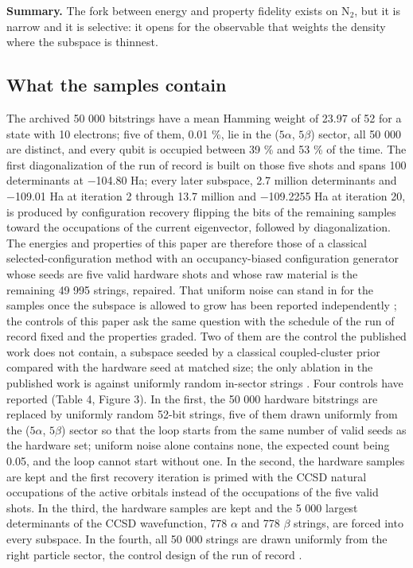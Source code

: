\documentclass[11pt]{article}
\begin{document}
\textbf{Summary.} The fork between energy and property fidelity exists on N$_2$, but it is narrow and it is selective: it opens for the observable that weights the density where the subspace is thinnest.

\subsection{What the samples contain}\label{sec:3.4}


The archived 50 000 bitstrings have a mean Hamming weight of 23.97 of 52 for a state with 10 electrons; five of them, 0.01 \%, lie in the ($5\alpha$, $5\beta$) sector, all 50 000 are distinct, and every qubit is occupied between 39 \% and 53 \% of the time. The first diagonalization of the run of record is built on those five shots and spans 100 determinants at $-$104.80 Ha; every later subspace, 2.7 million determinants and $-$109.01 Ha at iteration 2 through 13.7 million and $-$109.2255 Ha at iteration 20, is produced by configuration recovery flipping the bits of the remaining samples toward the occupations of the current eigenvector, followed by diagonalization. The energies and properties of this paper are therefore those of a classical selected-configuration method with an occupancy-biased configuration generator whose seeds are five valid hardware shots and whose raw material is the remaining 49 995 strings, repaired. That uniform noise can stand in for the samples once the subspace is allowed to grow has been reported independently \cite{vanRossum2026}; the controls of this paper ask the same question with the schedule of the run of record fixed and the properties graded. Two of them are the control the published work does not contain, a subspace seeded by a classical coupled-cluster prior compared with the hardware seed at matched size; the only ablation in the published work is against uniformly random in-sector strings \cite{SQD,IBMdata}. Four controls have reported (Table 4, Figure 3). In the first, the 50 000 hardware bitstrings are replaced by uniformly random 52-bit strings, five of them drawn uniformly from the ($5\alpha$, $5\beta$) sector so that the loop starts from the same number of valid seeds as the hardware set; uniform noise alone contains none, the expected count being 0.05, and the loop cannot start without one. In the second, the hardware samples are kept and the first recovery iteration is primed with the CCSD natural occupations of the active orbitals instead of the occupations of the five valid shots. In the third, the hardware samples are kept and the 5 000 largest determinants of the CCSD wavefunction, 778 $\alpha$ and 778 $\beta$ strings, are forced into every subspace. In the fourth, all 50 000 strings are drawn uniformly from the right particle sector, the control design of the run of record \cite{SQD}.
\end{document}
